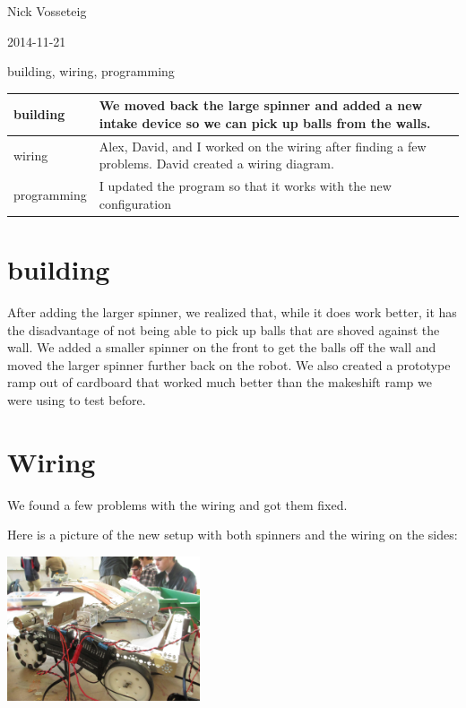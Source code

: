 Nick Vosseteig

2014-11-21

building, wiring, programming

\begin{tabular}{|p{5cm}|p{5cm}|}
 \hline
 building&
We moved back the large spinner and added a new intake device so we can pick up balls from the walls.
 \\
 \hline
wiring&
Alex, David, and I worked on the wiring after finding a few problems. David created a wiring diagram.
 \\
 \hline
programming&
I updated the program so that it works with the new configuration
 \\
 \hline
\end{tabular}

\section*{building}
After adding the larger spinner, we realized that, while it does work better, it has the disadvantage of not being able to pick up balls that are shoved against the wall. We added a smaller spinner on the front to get the balls off the wall and moved the larger spinner further back on the robot. We also created a prototype ramp out of cardboard that worked much better than the makeshift ramp we were using to test before.
\section*{Wiring}
We found a few problems with the wiring and got them fixed.

Here is a picture of the new setup with both spinners and the wiring on the sides:
\begin{center}
 \includegraphics[width=215px]{./Entries/Images/RobotDesignForNovemberTwentyFirstTwoThousandAndFourteenWithIntakeLauncherAndRampWiringIncludedILoveAlexHeIsTheBestNic.JPG}
\end{center}